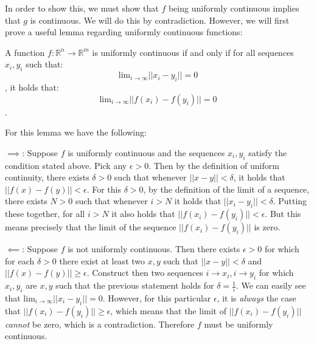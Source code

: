 \begin{solution}

    In order to show this, we must show that $f$ being uniformly continuous implies that $g$ is continuous. We will do this by contradiction. However, we will first prove a useful lemma regarding uniformly continuous functions:

    A function $f: \mathbb{R}^n \rightarrow \mathbb{R}^m$ is uniformly continuous if and only if for all sequences $x_i, y_i$ such that:
    $$\text{lim}_{i \rightarrow \infty} \lvert \lvert x_i - y_i \rvert \rvert = 0$$
    , it holds that:
    $$\text{lim}_{i \rightarrow \infty} \lvert \lvert f(x_i) - f(y_i) \rvert \rvert = 0$$.

    For this lemma we have the following:
    
    $\implies$: Suppose $f$ is uniformly continuous and the sequences $x_i, y_i$ satisfy the condition stated above. Pick any $\epsilon > 0$. Then by the definition of uniform continuity, there exists $\delta  >0 $ such that whenever $\lvert \lvert x - y \rvert \rvert < \delta$, it holds that $\lvert \lvert f(x) - f(y) \rvert \rvert < \epsilon$. For this $\delta > 0$, by the definition of the limit of a sequence, there exists $N > 0$ such that whenever $i > N$ it holds that $\lvert \lvert x_i - y_i\rvert \rvert < \delta$. Putting these together, for all $i > N$ it also holds that $\lvert \lvert f(x_i) - f(y_i) \rvert \rvert < \epsilon$. But this means precisely that the limit of the sequence $\lvert \lvert f(x_i) - f(y_i) \rvert \rvert$ is zero.
    
    $\impliedby$: Suppose $f$ is not uniformly continuous. Then there exists $\epsilon > 0$ for which for each $\delta > 0$ there exist at least two $x, y$ such that $\lvert \lvert x - y \rvert \rvert < \delta$ and $\lvert \lvert f(x) - f(y) \rvert \rvert \geq \epsilon$. Construct then two sequences $i \rightarrow x_i, i \rightarrow y_i$ for which $x_i, y_i$ are $x, y$ such that the previous statement holds for $\delta = \frac{1}{i}$. We can easily see that $\text{lim}_{i \rightarrow \infty} \lvert \lvert x_i - y_i \rvert \rvert = 0$. However, for this particular $\epsilon$, it is \textit{always} the case that $\lvert \lvert f(x_i) - f(y_i) \rvert \rvert \geq \epsilon$, which means that the limit of $\lvert \lvert f(x_i) - f(y_i) \rvert \rvert$ \textit{cannot} be zero, which is a contradiction. Therefore $f$ must be uniformly continuous.


\end{solution}
